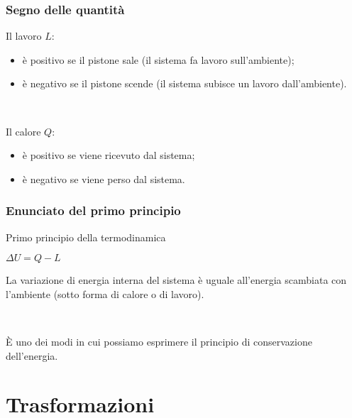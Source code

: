 \documentclass[]{beamer}
\theoremstyle{plain}
\begin{document}
\begin{frame}
\frametitle{Segno delle quantità}
Il lavoro $ L $:
\begin{itemize}
  \item è positivo se il pistone sale (il sistema fa lavoro sull'ambiente);\pause
  \item è negativo se il pistone scende (il sistema subisce un lavoro dall'ambiente).\pause
\end{itemize}

~

Il calore $ Q $:
\begin{itemize}
  \item è positivo se viene ricevuto dal sistema;\pause
  \item è negativo se viene perso dal sistema.
\end{itemize}
\end{frame}


\begin{frame}
\frametitle{Enunciato del primo principio}
\begin{block}{Primo principio della termodinamica}
\begin{center}
\colorbox{marroncino!30}{$ \Delta U = Q - L $}
\end{center}
La variazione di energia interna del sistema è uguale all'energia scambiata con l'ambiente (sotto forma di calore o di lavoro).
\end{block}\pause

~

È uno dei modi in cui possiamo esprimere il \alert{principio di conservazione dell'energia}.
\end{frame}

\section{Trasformazioni}
\end{document}
